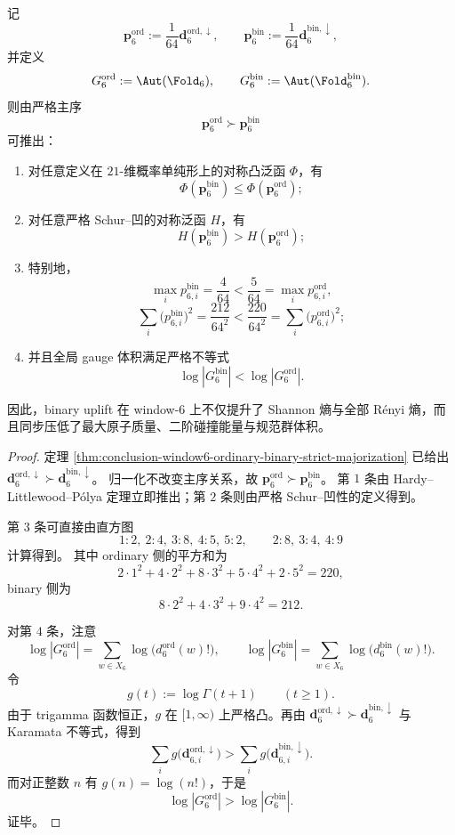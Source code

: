 \begin{theorem}\label{thm:conclusion-window6-schur-flattening-convex-collapse}
记
\[
\mathbf p_6^{\mathrm{ord}}
:=
\frac{1}{64}\mathbf d_6^{\mathrm{ord},\downarrow},
\qquad
\mathbf p_6^{\mathrm{bin}}
:=
\frac{1}{64}\mathbf d_6^{\mathrm{bin},\downarrow},
\]
并定义
\[
G_6^{\mathrm{ord}}:=\Aut(\Fold_6),
\qquad
G_6^{\mathrm{bin}}:=\Aut(\Fold_6^{\mathrm{bin}}).
\]
则由严格主序
\[
\mathbf p_6^{\mathrm{ord}}\succ \mathbf p_6^{\mathrm{bin}}
\]
可推出：
\begin{enumerate}
\item 对任意定义在 \(21\)-维概率单纯形上的对称凸泛函 \(\Phi\)，有
\[
\Phi(\mathbf p_6^{\mathrm{bin}})\le \Phi(\mathbf p_6^{\mathrm{ord}});
\]
\item 对任意严格 Schur--凹的对称泛函 \(H\)，有
\[
H(\mathbf p_6^{\mathrm{bin}})>H(\mathbf p_6^{\mathrm{ord}});
\]
\item 特别地，
\[
\max_i p_{6,i}^{\mathrm{bin}}=\frac{4}{64}
<
\frac{5}{64}=\max_i p_{6,i}^{\mathrm{ord}},
\]
\[
\sum_i\bigl(p_{6,i}^{\mathrm{bin}}\bigr)^2=\frac{212}{64^2}
<
\frac{220}{64^2}=
\sum_i\bigl(p_{6,i}^{\mathrm{ord}}\bigr)^2;
\]
\item 并且全局 gauge 体积满足严格不等式
\[
\log |G_6^{\mathrm{bin}}|<\log |G_6^{\mathrm{ord}}|.
\]
\end{enumerate}
因此，binary uplift 在 window-\(6\) 上不仅提升了 Shannon 熵与全部 Rényi 熵，而且同步压低了最大原子质量、二阶碰撞能量与规范群体积。
\end{theorem}
\begin{proof}
定理 \ref{thm:conclusion-window6-ordinary-binary-strict-majorization} 已给出
\(
\mathbf d_6^{\mathrm{ord},\downarrow}\succ \mathbf d_6^{\mathrm{bin},\downarrow}
\)。
归一化不改变主序关系，故
\(
\mathbf p_6^{\mathrm{ord}}\succ \mathbf p_6^{\mathrm{bin}}
\)。
第 \(1\) 条由 Hardy--Littlewood--Pólya 定理立即推出；第 \(2\) 条则由严格 Schur--凹性的定义得到。

第 \(3\) 条可直接由直方图
\[
1:2,\ 2:4,\ 3:8,\ 4:5,\ 5:2,
\qquad
2:8,\ 3:4,\ 4:9
\]
计算得到。
其中 ordinary 侧的平方和为
\[
2\cdot 1^2+4\cdot 2^2+8\cdot 3^2+5\cdot 4^2+2\cdot 5^2=220,
\]
binary 侧为
\[
8\cdot 2^2+4\cdot 3^2+9\cdot 4^2=212.
\]

对第 \(4\) 条，注意
\[
\log |G_6^{\mathrm{ord}}|
=
\sum_{w\in X_6}\log\bigl(d_6^{\mathrm{ord}}(w)!\bigr),
\qquad
\log |G_6^{\mathrm{bin}}|
=
\sum_{w\in X_6}\log\bigl(d_6^{\mathrm{bin}}(w)!\bigr).
\]
令
\[
g(t):=\log\Gamma(t+1)\qquad (t\ge 1).
\]
由于 trigamma 函数恒正，\(g\) 在 \([1,\infty)\) 上严格凸。再由
\(
\mathbf d_6^{\mathrm{ord},\downarrow}\succ \mathbf d_6^{\mathrm{bin},\downarrow}
\)
与 Karamata 不等式，得到
\[
\sum_i g\!\bigl(\mathbf d_{6,i}^{\mathrm{ord},\downarrow}\bigr)
>
\sum_i g\!\bigl(\mathbf d_{6,i}^{\mathrm{bin},\downarrow}\bigr).
\]
而对正整数 \(n\) 有 \(g(n)=\log(n!)\)，于是
\[
\log |G_6^{\mathrm{ord}}|>\log |G_6^{\mathrm{bin}}|.
\]
证毕。
\end{proof}

